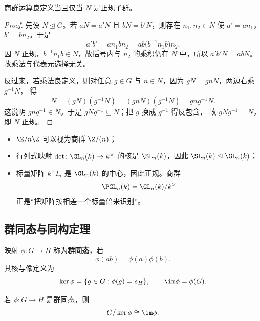 \begin{proposition}
商群运算良定义当且仅当 $N$ 是正规子群。
\end{proposition}

\begin{proof}
先设 $N\trianglelefteq G$。若 $aN=a'N$ 且 $bN=b'N$，则存在 $n_1,n_2\in N$ 使
$a'=an_1$，$b'=bn_2$。于是
\[
  a'b' = an_1bn_2 = ab\bigl(b^{-1}n_1b\bigr)n_2.
\]
因 $N$ 正规，$b^{-1}n_1b\in N$，故括号内与 $n_2$ 的乘积仍在 $N$ 中，所以
$a'b'N=abN$。故乘法与代表元选择无关。

反过来，若乘法良定义，则对任意 $g\in G$ 与 $n\in N$，因为 $gN=g n N$，两边右乘 $g^{-1}N$，
得
\[
  N=(gN)(g^{-1}N)=(gnN)(g^{-1}N)=gng^{-1}N.
\]
这说明 $gng^{-1}\in N$。于是 $gNg^{-1}\subseteq N$；把 $g$ 换成 $g^{-1}$ 得反包含，
故 $gNg^{-1}=N$，即 $N$ 正规。
\end{proof}

\begin{example}
\begin{itemize}
  \item $\Z/n\Z$ 可以视为商群 $\Z/(n)$；
  \item 行列式映射 $\det\colon \GL_n(k)\to k^\times$ 的核是 $\SL_n(k)$，因此
  $\SL_n(k)\trianglelefteq \GL_n(k)$；
  \item 标量矩阵 $k^\times I_n$ 是 $\GL_n(k)$ 的中心，因此正规。商群
  \[
    \PGL_n(k)=\GL_n(k)/k^\times
  \]
  正是“把矩阵按相差一个标量倍来识别”。
\end{itemize}
\end{example}

\subsection{群同态与同构定理}

\begin{definition}
映射 $\phi\colon G\to H$ 称为\textbf{群同态}，若
\begin{equation}
  \phi(ab)=\phi(a)\phi(b).
\end{equation}
其核与像定义为
\[
  \ker\phi=\{g\in G:\phi(g)=e_H\},
  \qquad
  \im\phi=\phi(G).
\]
\end{definition}

\begin{theorem}[第一同构定理]
若 $\phi\colon G\to H$ 是群同态，则
\begin{equation}
  G/\ker\phi \cong \im\phi.
\end{equation}
\end{theorem}

